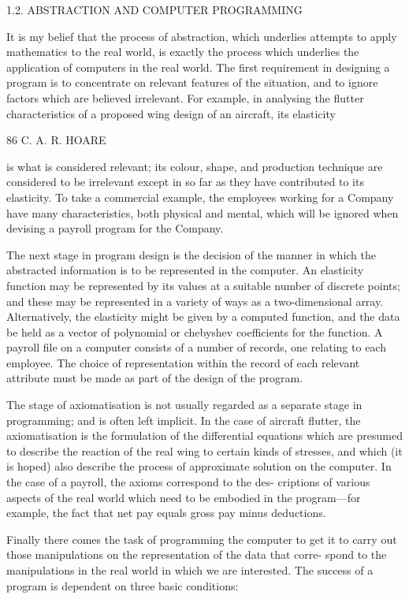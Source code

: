 1.2. ABSTRACTION AND COMPUTER PROGRAMMING

It is my belief that the process of abstraction, which underlies attempts to apply mathematics to the real world, is exactly the process which underlies the application of computers in the real world. The first requirement in designing a program is to concentrate on relevant features of the situation, and to ignore factors which are believed irrelevant. For example, in analysing the flutter characteristics of a proposed wing design of an aircraft, its elasticity

86 C. A. R. HOARE

is what is considered relevant; its colour, shape, and production technique are considered to be irrelevant except in so far as they have contributed to its elasticity. To take a commercial example, the employees working for a Company have many characteristics, both physical and mental, which will be ignored when devising a payroll program for the Company.

The next stage in program design is the decision of the manner in which the abstracted information is to be represented in the computer. An elasticity function may be represented by its values at a suitable number of discrete points; and these may be represented in a variety of ways as a two-dimensional array. Alternatively, the elasticity might be given by a computed function, and the data be held as a vector of polynomial or chebyshev coefficients for the function. A payroll file on a computer consists of a number of records, one relating to each employee. The choice of representation within the record of each relevant attribute must be made as part of the design of the program.

The stage of axiomatisation is not usually regarded as a separate stage in programming; and is often left implicit. In the case of aircraft flutter, the axiomatisation is the formulation of the differential equations which are presumed to describe the reaction of the real wing to certain kinds of stresses, and which (it is hoped) also describe the process of approximate solution on the computer. In the case of a payroll, the axioms correspond to the des- criptions of various aspects of the real world which need to be embodied in the program—for example, the fact that net pay equals gross pay minus deductions.

Finally there comes the task of programming the computer to get it to carry out those manipulations on the representation of the data that corre- spond to the manipulations in the real world in which we are interested. The success of a program is dependent on three basic conditions:

